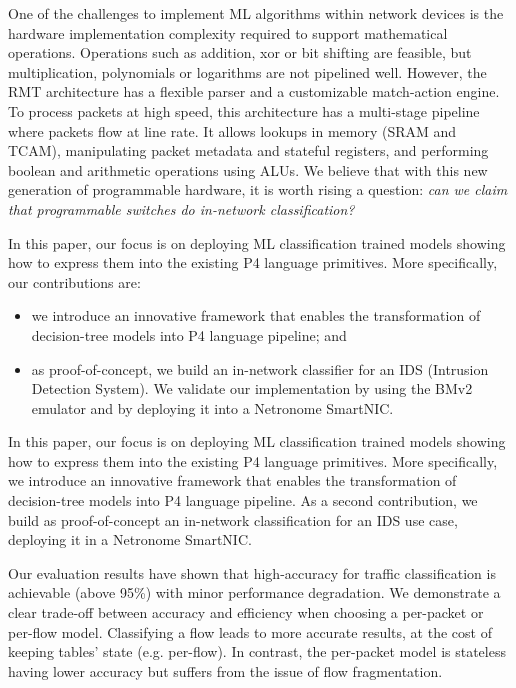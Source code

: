 One of the challenges to implement ML algorithms within network devices is the hardware implementation complexity required to support mathematical operations. Operations such as addition, xor or bit shifting are feasible, but multiplication, polynomials or logarithms are not pipelined well. However, the RMT architecture \cite{bosshart2013forwarding} has a flexible parser and a customizable match-action
engine. To process packets at high speed, this architecture has a multi-stage pipeline where packets flow at line rate. It
allows lookups in memory (SRAM and TCAM), manipulating packet metadata and stateful registers, and performing boolean and arithmetic operations using ALUs. We believe that with this new generation of programmable hardware, it is worth rising a  question: \textit{can we claim that programmable switches do in-network classification?}

In this paper, our focus is on deploying ML classification trained models showing how to express them into the existing P4 language primitives. More specifically, our contributions are:
\begin{itemize}
    \item we introduce an innovative framework that enables the transformation of decision-tree models into P4 language pipeline; and
    \item as proof-of-concept, we build an in-network classifier for an IDS (Intrusion Detection System). We validate our implementation by using the BMv2 emulator \cite{p4-bmv2} and by deploying it into a Netronome SmartNIC. 
\end{itemize}

In this paper, our focus is on deploying ML classification trained models showing how to express them into the existing P4 language primitives. More specifically, we introduce an innovative framework that enables the transformation of decision-tree models into P4 language pipeline. As a second contribution, we build as proof-of-concept an in-network classification for an IDS use case, deploying it in a Netronome SmartNIC. 

Our evaluation results have shown that high-accuracy for traffic classification is achievable (above  95\%) with minor performance degradation. We demonstrate a clear trade-off between accuracy and efficiency when choosing a per-packet or per-flow model. Classifying a flow  leads to more accurate results, at the cost of keeping tables' state (e.g. per-flow). In contrast, the per-packet model is stateless having lower accuracy but suffers from the issue of flow fragmentation.
\fi

